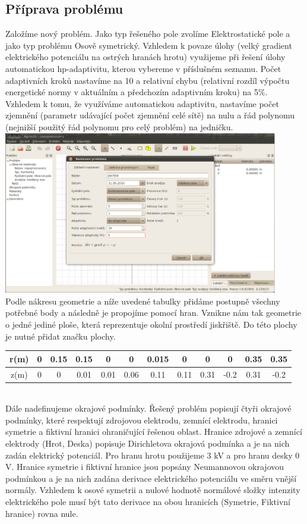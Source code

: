 \documentclass[a4paper, oneside]{article}
\begin{document}
\subsection{Příprava problému}
Založíme nový problém. Jako typ řešeného pole zvolíme Elektrostatické pole a jako typ problému Osově symetrický. Vzhledem k povaze úlohy (velký gradient elektrického potenciálu na ostrých hranách hrotu) využijeme při řešení úlohy automatickou hp-adaptivitu, kterou vybereme v příslušném seznamu. Počet adaptivních kroků nastavíme na 10 a relativní chybu (relativní rozdíl výpočtu energetické normy v aktuálním a předchozím adaptivním kroku) na 5\%. Vzhledem k tomu, že využíváme automatickou adaptivitu, nastavíme počet zjemnění (parametr udávající počet zjemnění celé sítě) na nulu a řád polynomu (nejnižší použitý řád polynomu pro celý problém) na jedničku.\\
\includegraphics[width=12cm]{Nastaveni_problemu.eps}\\
Podle nákresu geometrie a níže uvedené tabulky přidáme postupně všechny potřebné body a následně je propojíme pomocí hran. Vznikne nám tak geometrie o jedné jediné ploše, která reprezentuje okolní prostředí jiskřiště. Do této plochy je nutné přidat značku plochy.\\
\begin{tabular}{|c|c|c|c|c|c|c|c|c|c|c|c|}
\hline
r(m) & 0 & 0.15 & 0.15 & 0 & 0 & 0.015 & 0 & 0 & 0 & 0.35 & 0.35\\
\hline
z(m) & 0 & 0 & 0.01 & 0.01 & 0.06 & 0.11 & 0.11 & 0.31 & -0.2 & 0.31 & -0.2\\
\hline 
\end{tabular} \\
Dále nadefinujeme okrajové podmínky. Řešený problém popisují čtyři okrajové podmínky, které respektují zdrojovou elektrodu, zemnící elektrodu, hranici symetrie a fiktivní hranici ohraničující řešenou oblast. Hranice zdrojové a zemnící elektrody (Hrot, Deska) popisuje Dirichletova okrajová podmínka a je na nich zadán elektrický potenciál. Pro hranu hrotu použijeme 3 kV a pro hranu desky 0 V. Hranice symetrie i fiktivní hranice jsou popsány Neumannovou okrajovou podmínkou a je na nich zadána derivace elektrického potenciálu ve směru vnější normály. Vzhledem k osové symetrii a nulové hodnotě normálové složky intenzity elektrického pole musí být tato derivace na obou hranicích (Symetrie, Fiktivní hranice) rovna nule.\\
\end{document}
